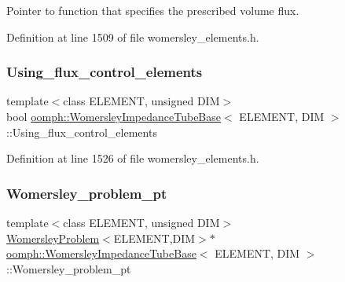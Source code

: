 Pointer to function that specifies the prescribed volume flux. 



Definition at line 1509 of file womersley\+\_\+elements.\+h.

\mbox{\label{classoomph_1_1WomersleyImpedanceTubeBase_a01ab12fe40acf7a477b892e7c7cd0831}} 
\subsubsection{\texorpdfstring{Using\+\_\+flux\+\_\+control\+\_\+elements}{Using\_flux\_control\_elements}}
{\footnotesize\ttfamily template$<$class E\+L\+E\+M\+E\+NT, unsigned D\+IM$>$ \\
bool \hyperlink{classoomph_1_1WomersleyImpedanceTubeBase}{oomph\+::\+Womersley\+Impedance\+Tube\+Base}$<$ E\+L\+E\+M\+E\+NT, D\+IM $>$\+::Using\+\_\+flux\+\_\+control\+\_\+elements\hspace{0.3cm}{\ttfamily [private]}}



Definition at line 1526 of file womersley\+\_\+elements.\+h.

\mbox{\label{classoomph_1_1WomersleyImpedanceTubeBase_ab424ec7b47d3f31acd44dcf93be6b5e5}} 
\subsubsection{\texorpdfstring{Womersley\+\_\+problem\+\_\+pt}{Womersley\_problem\_pt}}
{\footnotesize\ttfamily template$<$class E\+L\+E\+M\+E\+NT, unsigned D\+IM$>$ \\
\hyperlink{classoomph_1_1WomersleyProblem}{Womersley\+Problem}$<$E\+L\+E\+M\+E\+NT,D\+IM$>$$\ast$ \hyperlink{classoomph_1_1WomersleyImpedanceTubeBase}{oomph\+::\+Womersley\+Impedance\+Tube\+Base}$<$ E\+L\+E\+M\+E\+NT, D\+IM $>$\+::Womersley\+\_\+problem\+\_\+pt\hspace{0.3cm}{\ttfamily [protected]}}



